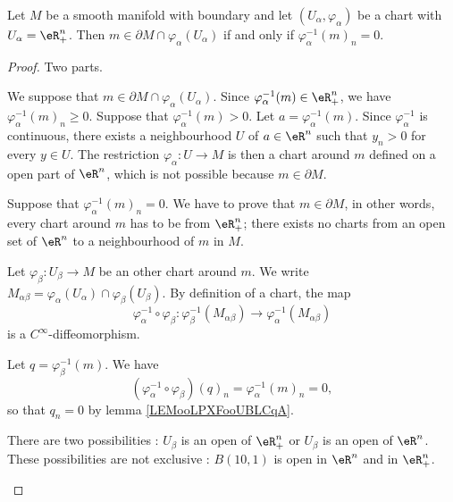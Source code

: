 \begin{proposition}	\label{PROPooWQHTooXhkWdZ}
	Let \( M\) be a smooth manifold with boundary and let \( (U_{\alpha}, \varphi_{\alpha})\) be a chart with \( U_{\alpha}=\eR^n_+\). Then \( m\in \partial M\cap \varphi_{\alpha}(U_{\alpha})\) if and only if \( \varphi_{\alpha}^{-1}(m)_n=0\).
\end{proposition}

\begin{proof}
	Two parts.
	\begin{subproof}
		\spitem[\( \Rightarrow\)]
		We suppose that \( m\in \partial M\cap \varphi_{\alpha}(U_{\alpha})\). Since \( \varphi_{\alpha}^{-1}(m)\in \eR^n_+\), we have \( \varphi_{\alpha}^{-1}(m)_n\geq 0\). Suppose that \( \varphi_{\alpha}^{-1}(m)>0\). Let \( a=\varphi_{\alpha}^{-1}(m)\). Since \( \varphi_{\alpha}^{-1}\) is continuous, there exists a neighbourhood \( U\) of \(a\in \eR^n \) such that \( y_n>0\) for every \( y\in U\). The restriction \(\varphi_{\alpha} \colon U\to M  \) is then a chart around \( m\) defined on a open part of \( \eR^n\), which is not possible because \( m\in\partial M\).

		\spitem[\( \Leftarrow\)]
		Suppose that \( \varphi_{\alpha}^{-1}(m)_n=0\). We have to prove that \( m\in\partial M\), in other words, every chart around \( m\) has to be from \( \eR^n_+\); there exists no charts from an open set of \( \eR^n\) to a neighbourhood of \( m\) in \( M\).

		Let \(\varphi_{\beta} \colon U_{\beta}\to M  \) be an other chart around \( m\). We write \( M_{\alpha\beta}=\varphi_{\alpha}(U_{\alpha})\cap \varphi_{\beta}(U_{\beta})\). By definition of a chart, the map
		\begin{equation}
			\varphi_{\alpha}^{-1}\circ \varphi_{\beta} \colon \varphi_{\beta}^{-1}(M_{\alpha\beta})\to \varphi_{\alpha}^{-1}(M_{\alpha\beta})
		\end{equation}
		is a \( C^{\infty}\)-diffeomorphism.

		Let \( q=\varphi_{\beta}^{-1}(m)\). We have
		\begin{equation}
			(\varphi_{\alpha}^{-1}\circ\varphi_{\beta})(q)_n=\varphi_{\alpha}^{-1}(m)_n=0,
		\end{equation}
		so that \( q_n=0\) by lemma \ref{LEMooLPXFooUBLCqA}.

		There are two possibilities : \( U_{\beta}\) is an open of \( \eR^n_+\) or \( U_{\beta}\) is an open of \( \eR^n\). These possibilities are not exclusive : \( B(10,1)\) is open in \( \eR^n\) and in \( \eR^n_+\).


\end{subproof}
\end{proof}
